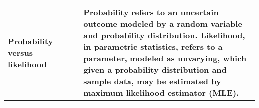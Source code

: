 \begin{singlespace}
\begin{longtable}{p{0.3\linewidth}p{0.7\linewidth}}
\makecell[r]{\textbf{Probability versus}\\ \textbf{likelihood}} & Probability refers to an uncertain outcome modeled by a random variable and probability distribution. Likelihood, in parametric statistics, refers to a parameter, modeled as unvarying, which given a probability distribution and sample data, may be estimated by maximum likelihood estimator (MLE).\\
\hline
\label{appendix:glossary_datascience_stats}
\end{longtable}
\end{singlespace}


